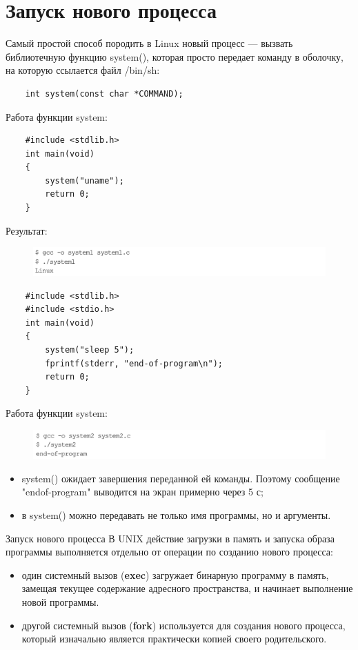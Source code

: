 \documentclass[xcolor=table]{beamer}
\begin{document}
\section{Запуск нового процесса}

\begin{frame}[fragile]
	Самый простой способ породить в Linux новый процесс — вызвать библиотечную функцию  system(), которая просто передает команду в оболочку, на которую ссылается файл /bin/sh:
	\begin{verbatim}
	int system(const char *COMMAND);
	\end{verbatim}
	Работа функции system:
	\begin{verbatim}
	#include <stdlib.h>
	int main(void)
	{
		system("uname");
		return 0;
	}
	\end{verbatim}
	Результат:
	\begin{figure}[h]
		\centering
		\includegraphics[scale=0.5]{images/lec07-pic19.png}
	\end{figure}
\end{frame}

\begin{frame}[fragile]
	\begin{verbatim}
	#include <stdlib.h>
	#include <stdio.h>	
	int main(void)
	{
		system("sleep 5");
		fprintf(stderr, "end-of-program\n");
		return 0;
	}
	\end{verbatim}
	Работа функции system:
	\begin{figure}[h]
		\centering
		\includegraphics[scale=0.4]{images/lec07-pic21.png}
	\end{figure}
	\begin{itemize}
		\item system() ожидает завершения переданной ей команды. Поэтому сообщение "endof-program" выводится на экран примерно через 5 с;
		\item в system() можно передавать не только имя программы, но и аргументы.
	\end{itemize}
\end{frame}

\begin{frame}{Запуск нового процесса}
	В UNIX действие загрузки в память и запуска образа программы выполняется отдельно от операции по созданию нового процесса:
	\begin{itemize}
		\item один системный вызов (\textbf{exec}) загружает бинарную программу в память, замещая текущее содержание адресного пространства, и начинает выполнение новой программы. 
		\item другой системный вызов (\textbf{fork}) используется для создания нового процесса, который изначально является практически копией своего 	родительского.
	\end{itemize}
\end{frame}
\end{document}

